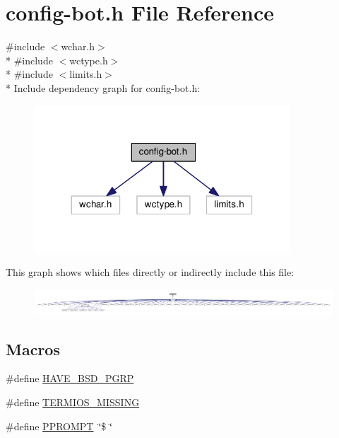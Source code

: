\hypertarget{config-bot_8h}{}\section{config-\/bot.h File Reference}
\label{config-bot_8h}
{\ttfamily \#include $<$wchar.\+h$>$}\\*
{\ttfamily \#include $<$wctype.\+h$>$}\\*
{\ttfamily \#include $<$limits.\+h$>$}\\*
Include dependency graph for config-\/bot.h\+:
\nopagebreak
\begin{figure}[H]
\begin{center}
\leavevmode
\includegraphics[width=272pt]{config-bot_8h__incl}
\end{center}
\end{figure}
This graph shows which files directly or indirectly include this file\+:
\nopagebreak
\begin{figure}[H]
\begin{center}
\leavevmode
\includegraphics[width=350pt]{config-bot_8h__dep__incl}
\end{center}
\end{figure}
\subsection*{Macros}
\begin{DoxyCompactItemize}
\item 
\#define \hyperlink{config-bot_8h_adfdae13dec70a63e589f32ffcfc34cc7}{H\+A\+V\+E\+\_\+\+B\+S\+D\+\_\+\+P\+G\+RP}
\item 
\#define \hyperlink{config-bot_8h_a7e48877f31ee71d9caa6e6e2e8e36a47}{T\+E\+R\+M\+I\+O\+S\+\_\+\+M\+I\+S\+S\+I\+NG}
\item 
\#define \hyperlink{config-bot_8h_a5bbc7fdbf76c507888114ff136f5e313}{P\+P\+R\+O\+M\+PT}~\char`\"{}\$ \char`\"{}
\end{DoxyCompactItemize}


